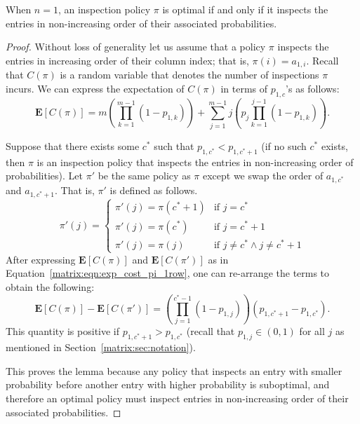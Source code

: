  \begin{lemma}\label{matrix:lemma:single_row_opt}
 When $n = 1$, an inspection policy $\pi$ is optimal if and only if it inspects the entries in non-increasing order of their associated probabilities.
 \end{lemma}
 \begin{proof}
 	Without loss of generality let us assume that a policy $\pi$ inspects the entries in increasing order of their column index; that is, $\pi(i) = a_{1,i}$. 
 	Recall that $C(\pi)$ is a random variable that denotes the number of inspections $\pi$ incurs. 
 	We can express the expectation of $C(\pi)$ in terms of $p_{1,c}$'s as follows:
 	\small
 	\begin{equation} \label{matrix:eqn:exp_cost_pi_1row}
 		\mathbf{E}\left[C(\pi)\right] = 
 		m \left(\prod_{k=1}^{m-1}(1 - p_{1,k})\right) + 
 		\sum_{j=1}^{m-1} j \left(p_j \prod_{k=1}^{j-1} (1-p_{1,k}) \right).
 	\end{equation}
 	\normalsize
	
 	Suppose that there exists some $c^*$ such that $p_{1,c^*} < p_{1,c^*+1}$ (if no such $c^*$ exists, then $\pi$ is an inspection policy that inspects the entries in non-increasing order of probabilities).
 	Let $\pi'$ be the same policy as $\pi$ except we swap the order of $a_{1,c^*}$ and $a_{1,c^*+1}$. 
 	That is, $\pi'$ is defined as follows.
 	\begin{equation*}
 		\pi'(j) = 
 		\begin{cases}
 			\pi'(j) = \pi(c^*+1)&  \mbox{if~} j = c^* \\
 			\pi'(j) = \pi(c^*)  &  \mbox{if~} j = c^*+1 \\
 			\pi'(j) = \pi(j)  &  \mbox{if~} j \neq c^* \land j \neq c^*+1
 		\end{cases}
 	\end{equation*}	
 	After expressing $\mathbf{E}[C(\pi)]$ and $\mathbf{E}[C(\pi')]$ as in Equation~\ref{matrix:eqn:exp_cost_pi_1row}, one can re-arrange the terms to obtain the following:
 	\begin{equation} \label{matrix:eqn:proof_pi_1row}
 	\mathbf{E}\left[C(\pi)\right] - \mathbf{E}\left[C(\pi')\right] = 
 	\left(\prod_{j=1}^{c^*-1} (1-p_{1,j})\right) (p_{1,c^*+1} - p_{1,c^*}).
 	\end{equation}
 	This quantity is positive if $p_{1,c^*+1} > p_{1,c^*}$ (recall that $p_{1,j} \in (0,1)$ for all $j$ as mentioned in Section~\ref{matrix:sec:notation}). 
	
 	This proves the lemma because any policy that inspects an entry with smaller probability before another entry with higher probability is suboptimal, and therefore an optimal policy must inspect entries in non-increasing order of their associated probabilities. 
 \end{proof}
